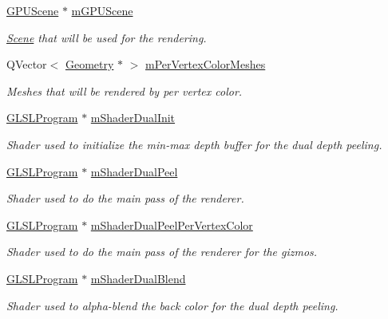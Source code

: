\begin{DoxyCompactItemize}
\hyperlink{class_g_p_u_scene}{G\+P\+U\+Scene} $\ast$ \hyperlink{class_g_l_canvas_a46e82ba1b95d09cbcb42e2db24c4d10a}{m\+G\+P\+U\+Scene}
\begin{DoxyCompactList}\small\item\em \hyperlink{class_scene}{Scene} that will be used for the rendering. \end{DoxyCompactList}\item 
Q\+Vector$<$ \hyperlink{class_geometry}{Geometry} $\ast$ $>$ \hyperlink{class_g_l_canvas_a7c28ed5eaacb35dddc0f8777e6b291ed}{m\+Per\+Vertex\+Color\+Meshes}
\begin{DoxyCompactList}\small\item\em Meshes that will be rendered by per vertex color. \end{DoxyCompactList}\item 
\hyperlink{class_g_l_s_l_program}{G\+L\+S\+L\+Program} $\ast$ \hyperlink{class_g_l_canvas_adad92626cf28f8115762dc7f1b6ddc04}{m\+Shader\+Dual\+Init}
\begin{DoxyCompactList}\small\item\em Shader used to initialize the min-\/max depth buffer for the dual depth peeling. \end{DoxyCompactList}\item 
\hyperlink{class_g_l_s_l_program}{G\+L\+S\+L\+Program} $\ast$ \hyperlink{class_g_l_canvas_a4321e3211f585a47a026f46de456267b}{m\+Shader\+Dual\+Peel}
\begin{DoxyCompactList}\small\item\em Shader used to do the main pass of the renderer. \end{DoxyCompactList}\item 
\hyperlink{class_g_l_s_l_program}{G\+L\+S\+L\+Program} $\ast$ \hyperlink{class_g_l_canvas_a78abb793d487793faf1e4870894264ee}{m\+Shader\+Dual\+Peel\+Per\+Vertex\+Color}
\begin{DoxyCompactList}\small\item\em Shader used to do the main pass of the renderer for the gizmos. \end{DoxyCompactList}\item 
\hyperlink{class_g_l_s_l_program}{G\+L\+S\+L\+Program} $\ast$ \hyperlink{class_g_l_canvas_a63597026b7698a27ca2b65947b07a8c4}{m\+Shader\+Dual\+Blend}
\begin{DoxyCompactList}\small\item\em Shader used to alpha-\/blend the back color for the dual depth peeling. \end{DoxyCompactList}\item 

\end{DoxyCompactItemize}
